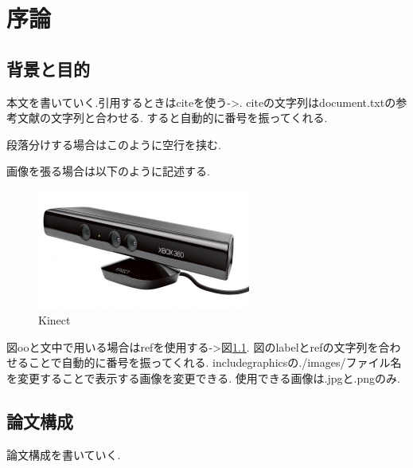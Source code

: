 \chapter{序論}\label{abst}
\section{背景と目的}
本文を書いていく.引用するときはciteを使う->\cite{cite_1}.
citeの文字列はdocument.txtの参考文献の文字列と合わせる.
すると自動的に番号を振ってくれる.

段落分けする場合はこのように空行を挟む.

画像を張る場合は以下のように記述する.

\begin{figure}[htbp]
  \begin{center}
    \includegraphics[clip,width=7.0cm]{./images/Kinect.jpg}
    \caption{Kinect}
    \label{fig:Kinect}
  \end{center}
\end{figure}

図ooと文中で用いる場合はrefを使用する->図\ref{fig:Kinect}.
図のlabelとrefの文字列を合わせることで自動的に番号を振ってくれる.
includegraphicsの./images/ファイル名を変更することで表示する画像を変更できる.
使用できる画像は.jpgと.pngのみ.

\section{論文構成}
論文構成を書いていく.
